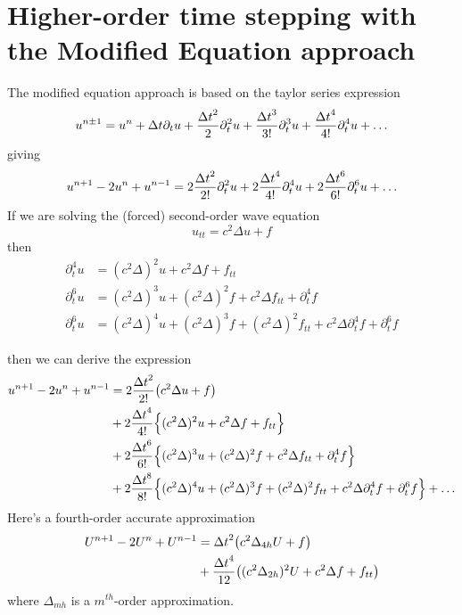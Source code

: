 \section{Higher-order time stepping with the Modified Equation approach}

The modified equation approach is based on the taylor series expression
\[
   u^{n\pm1}= u^n + {\Delta t} \partial_t u + {{\Delta t}^2\over 2} \partial_t^2 u
                                     + {{\Delta t}^3\over 3!} \partial_t^3 u 
                                     + {{\Delta t}^4\over 4!} \partial_t^4 u + \ldots
\]
giving
\[
   u^{n+1} -2 u ^n + u^{n-1}  =  2{{\Delta t}^2\over 2!} \partial_t^2 u + 2 {{\Delta t}^4\over 4!} \partial_t^4 u
                    + 2 {{\Delta t}^6\over 6!} \partial_t^6 u + \ldots
\]
If we are solving the (forced) second-order wave equation
\[
    u_{tt} = c^2 \Delta u + f 
\] 
then
\begin{align*}
  \partial_t^4 u &= (c^2 \Delta )^2 u + c^2 \Delta f  + f_{tt} \\
  \partial_t^6 u &= (c^2 \Delta )^3 u + (c^2 \Delta)^2 f + c^2 \Delta f_{tt} + \partial_t^4 f \\
  \partial_t^6 u &= (c^2 \Delta )^4 u + (c^2 \Delta)^3 f + (c^2 \Delta)^2 f_{tt} 
                 + c^2 \Delta \partial_t^4 f + \partial_t^6 f
\end{align*}

then we can derive the expression
\begin{align*}
  u^{n+1} -2 u ^n + u^{n-1} &= 2{{\Delta t}^2\over 2!} \big(c^2 \Delta u +f \big) \\
   & + 2 {{\Delta t}^4\over 4!} \Big\{ (c^2 \Delta)^2 u + c^2 \Delta f + f_{tt}\Big\} \\
   & + 2 {{\Delta t}^6\over 6!} \Big\{ (c^2 \Delta)^3 u + (c^2 \Delta)^2 f + c^2 \Delta f_{tt} + \partial_t^4 f \Big\} \\
   & + 2 {{\Delta t}^8\over 8!} \Big\{ (c^2 \Delta )^4 u+ (c^2 \Delta)^3 f + (c^2 \Delta)^2 f_{tt} 
                 + c^2 \Delta \partial_t^4 f + \partial_t^6 f \Big\}  + \ldots
\end{align*}
Here's a fourth-order accurate approximation
\begin{align}
  U^{n+1} -2 U ^n + U^{n-1} &= {\Delta t}^2 \big(c^2 \Delta_{4h} U + f \big) \\
                   & + {{\Delta t}^4\over 12} \big( (c^2 \Delta_{2h})^2 U + c^2 \Delta f  + f_{tt} \big) \label{eq:modifiedOrder4}
\end{align}
where $\Delta_{mh}$ is a $m^{th}$-order approximation.

